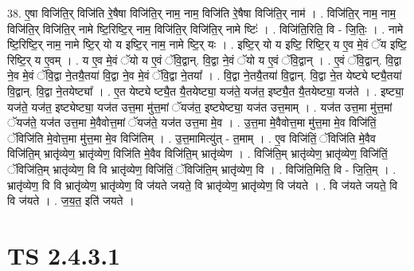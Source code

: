 \documentclass[17pt]{extarticle}
\begin{document}
38. ए॒षा विजि॑ति॒र् विजि॑ति रे॒षैषा विजि॑ति॒र् नाम॒ नाम॒ विजि॑ति रे॒षैषा विजि॑ति॒र् नाम॑ । . विजि॑ति॒र् नाम॒ नाम॒ विजि॑ति॒र् विजि॑ति॒र् नामे ष्टि॒रिष्टि॒र् नाम॒ विजि॑ति॒र् विजि॑ति॒र् नामे ष्टिः॑ । . विजि॑ति॒रिति॒ वि - जि॒तिः॒ । . नामे ष्टि॒रिष्टि॒र् नाम॒ नामे ष्टि॒र् यो य इष्टि॒र् नाम॒ नामे ष्टि॒र् यः । . इष्टि॒र् यो य इष्टि॒ रिष्टि॒र् य ए॒व मे॒वं ॅय इष्टि॒ रिष्टि॒र् य ए॒वम् । . य ए॒व मे॒वं ॅयो य ए॒वं ॅवि॒द्वान्. वि॒द्वा ने॒वं ॅयो य ए॒वं ॅवि॒द्वान् । . ए॒वं ॅवि॒द्वान्. वि॒द्वा ने॒व मे॒वं ॅवि॒द्वा ने॒तयै॒तया॑ वि॒द्वा ने॒व मे॒वं ॅवि॒द्वा ने॒तया᳚ । . वि॒द्वा ने॒तयै॒तया॑ वि॒द्वान्. वि॒द्वा ने॒त येष्ट्ये ष्ट्यै॒तया॑ वि॒द्वान्. वि॒द्वा ने॒तयेष्ट्या᳚ । . ए॒त येष्ट्ये ष्ट्यै॒त यै॒तयेष्ट्या॒ यज॑ते॒ यज॑त॒ इष्ट्यै॒त यै॒तयेष्ट्या॒ यज॑ते । . इष्ट्या॒ यज॑ते॒ यज॑त॒ इष्ट्येष्ट्या॒ यज॑त उत्त॒मा मु॑त्त॒मां ॅयज॑त॒ इष्ट्येष्ट्या॒ यज॑त उत्त॒माम् । . यज॑त उत्त॒मा मु॑त्त॒मां ॅयज॑ते॒ यज॑त उत्त॒मा मे॒वैवोत्त॒मां ॅयज॑ते॒ यज॑त उत्त॒मा मे॒व । . उ॒त्त॒मा मे॒वैवोत्त॒मा मु॑त्त॒मा मे॒व विजि॑तिं॒ ॅविजि॑ति मे॒वोत्त॒मा मु॑त्त॒मा मे॒व विजि॑तिम् । . उ॒त्त॒मामित्यु॑त् - त॒माम् । . ए॒व विजि॑तिं॒ ॅविजि॑ति मे॒वैव विजि॑ति॒म् भ्रातृ॑व्येण॒ भ्रातृ॑व्येण॒ विजि॑ति मे॒वैव विजि॑ति॒म् भ्रातृ॑व्येण । . विजि॑ति॒म् भ्रातृ॑व्येण॒ भ्रातृ॑व्येण॒ विजि॑तिं॒ ॅविजि॑ति॒म् भ्रातृ॑व्येण॒ वि वि भ्रातृ॑व्येण॒ विजि॑तिं॒ ॅविजि॑ति॒म् भ्रातृ॑व्येण॒ वि । . विजि॑ति॒मिति॒ वि - जि॒ति॒म् । . भ्रातृ॑व्येण॒ वि वि भ्रातृ॑व्येण॒ भ्रातृ॑व्येण॒ वि ज॑यते जयते॒ वि भ्रातृ॑व्येण॒ भ्रातृ॑व्येण॒ वि ज॑यते । . वि ज॑यते जयते॒ वि वि ज॑यते । . ज॒य॒त॒ इति॑ जयते । \newline
\pagebreak
{}
\section*{ TS 2.4.3.1 }
\end{document}
